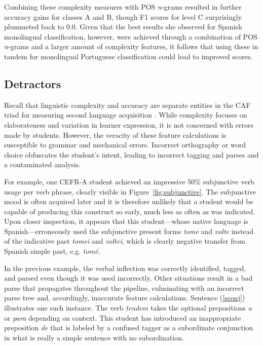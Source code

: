 Combining these complexity measures with POS \textit{n}-grams resulted in further accuracy gains for classes A and B, though F1 scores for level C surprisingly plummeted back to 0.0. Given that the best results she observed for Spanish monolingual classification, however, were achieved through a combination of POS \textit{n}-grams and a larger amount of complexity features, it follows that using these in tandem for monolingual Portuguese classification could lead to improved scores.

\subsection{Detractors}
\label{section:detractors}

Recall that linguistic complexity and accuracy are separate entities in the CAF triad for measuring second language acquisition \citep{housen2009}. While complexity focuses on elaborateness and variation in learner expression, it is not concerned with errors made by students. However, the veracity of these feature calculations is susceptible to grammar and mechanical errors. Incorrect orthography or word choice obfuscates the student's intent, leading to incorrect tagging and parses and a contaminated analysis.

For example, one CEFR-A student achieved an impressive 50\% subjunctive verb usage per verb phrase, clearly visible in Figure~\ref{fig:subjunctive}. The subjunctive mood is often acquired later and it is therefore unlikely that a student would be capable of producing this construct so early, much less as often as was indicated. Upon closer inspection, it appears that this student—whose native language is Spanish—erroneously used the subjunctive present forms \textit{tome} and \textit{volte} instead of the indicative past \textit{tomei} and \textit{voltei}, which is clearly negative transfer from Spanish simple past, e.g. \textit{tomé}.

In the previous example, the verbal inflection was correctly identified, tagged, and parsed even though it was used incorrectly. Other situations result in a bad parse that propagates throughout the pipeline, culminating with an incorrect parse tree and, accordingly, inaccurate feature calculations. Sentence (\ref{sconj}) illustrates one such instance. The verb \textit{tendem} takes the optional prepositions \textit{a} or \textit{para} depending on context. This student has introduced an inappropriate preposition \textit{de} that is labeled by a confused tagger as a subordinate conjunction in what is really a simple sentence with no subordination.

